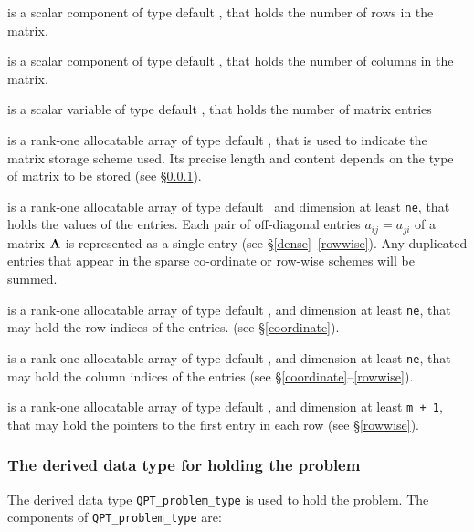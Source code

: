 \documentclass{galahad}
\begin{document}
\begin{description}

 is a scalar component of type default \integer, 
that holds the number of rows in the matrix. 
 
 is a scalar component of type default \integer, 
that holds the number of columns in the matrix. 
 
 is a scalar variable of type default \integer, that
holds the number of matrix entries

 is a rank-one allocatable array of type default \character, that
is used to indicate the matrix storage scheme used. Its precise length and
content depends on the type of matrix to be stored (see \S\ref{typeprob}).

 is a rank-one allocatable array of type default \realdp\, 
and dimension at least {\tt ne}, that holds the values of the entries. 
Each pair of off-diagonal entries $a_{ij} = a_{ji}$ of a matrix ${\mathbf{A}}$ 
is represented as a single entry 
(see \S\ref{dense}--\ref{rowwise}).
Any duplicated entries that appear in the sparse 
co-ordinate or row-wise schemes will be summed. 

 is a rank-one allocatable array of type default \integer, 
and dimension at least {\tt ne}, that may hold the row indices of the entries. 
(see \S\ref{coordinate}).

 is a rank-one allocatable array of type default \integer, 
and dimension at least {\tt ne}, that may hold the column indices of the entries
(see \S\ref{coordinate}--\ref{rowwise}).

 is a rank-one allocatable array of type default \integer, 
and dimension at least {\tt m + 1}, that may hold the pointers to
the first entry in each row (see \S\ref{rowwise}).

\end{description}


\subsubsection{The derived data type for holding the problem}\label{typeprob}
The derived data type {\tt QPT\_problem\_type} is used to hold 
the problem. The components of 
{\tt QPT\_problem\_type} 
are:
\end{document}

